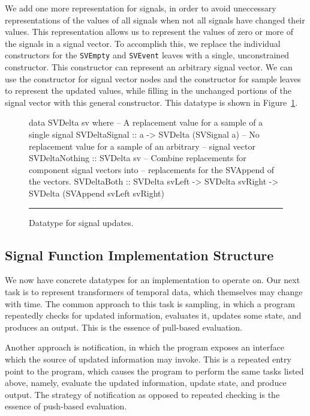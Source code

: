 We add one more representation for signals, in order to avoid uneccessary
representations of the values of all signals when not all signals have changed
their values. This representation allows us to represent the values of zero or
more of the signals in a signal vector. To accomplish this, we replace the
individual constructors for the {\tt SVEmpty} and {\tt SVEvent} leaves with %
a single, unconstrained constructor. This constructor can represent an arbitrary
signal vector. We can use the constructor for signal vector nodes and the 
constructor for sample leaves to represent the updated values, while filling
in the unchanged portions of the signal vector with this general constructor.
This datatype is shown in Figure~\ref{figure:signal_update_datatype}.

\begin{figure}
\begin{code}
data SVDelta sv where
  -- A replacement value for a sample of a single signal
  SVDeltaSignal  ::    a
                    -> SVDelta (SVSignal a)
  -- No replacement value for a sample of an arbitrary
  --  signal vector
  SVDeltaNothing ::    SVDelta sv
  -- Combine replacements for component signal vectors into 
  --   replacements for the SVAppend of the vectors.
  SVDeltaBoth    ::    SVDelta svLeft
                    -> SVDelta svRight
                    -> SVDelta (SVAppend svLeft svRight)
\end{code}
\hrule
\caption{Datatype for signal updates.}
\label{figure:signal_update_datatype}
\end{figure}

\subsection{Signal Function Implementation Structure}
\label{subsection:Implementation-Signal_Functions-Signal_Function_Implementation_Structure}

We now have concrete datatypes for an implementation to operate on. Our next
task is to represent transformers of temporal data, which themselves may change
with time. The common approach to this task is sampling, in which a program
repeatedly checks for updated information, evaluates it, updates some state,
and produces an output. This is the essence of pull-based evaluation.

Another approach is notification, in which the program exposes an interface
which the source of updated information may invoke. This is a repeated entry
point to the program, which causes the program to perform the same tasks
listed above, namely, evaluate the updated information, update state, and
produce output. The strategy of notification as opposed to repeated checking is
the essence of push-based evaluation.

